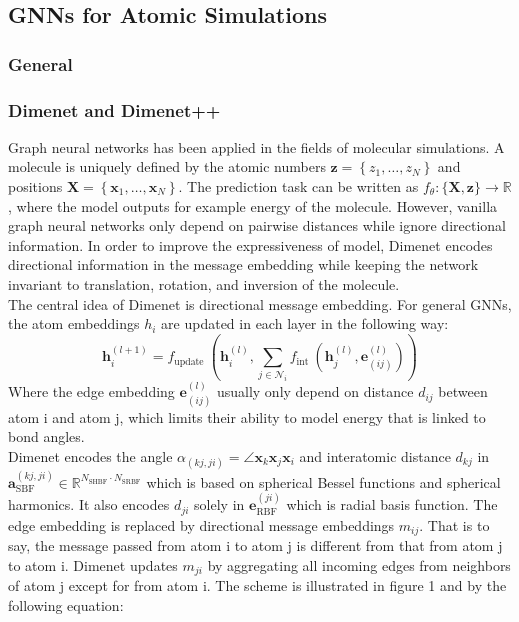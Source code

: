 \subsection{GNNs for Atomic Simulations}
\subsubsection{General}
\subsubsection{Dimenet and Dimenet++}
Graph neural networks has been applied in the fields of molecular simulations. A molecule is uniquely defined by the atomic numbers $\boldsymbol{z}=\left\{z_{1}, \ldots, z_{N}\right\}$ and positions $ \boldsymbol{X}=\left\{\boldsymbol{x}_{1}, \ldots, \boldsymbol{x}_{N}\right\}$. The prediction task can be written as $f_{\theta}:\{\boldsymbol{X}, \boldsymbol{z}\} \rightarrow \mathbb{R}$, where the model outputs for example energy of the molecule. However, vanilla graph neural networks only depend on pairwise distances while ignore directional information. In order to improve the expressiveness of model, Dimenet\cite*{DBLP:journals/corr/abs-2003-03123} encodes directional information in the message embedding while keeping the network invariant to translation, rotation, and inversion of the molecule\cite*{DBLP:journals/corr/abs-2003-03123}.\\
The central idea of Dimenet is directional message embedding. For general GNNs, the atom embeddings $h_i$ are updated in each layer in the following way:\\
\begin{equation}
    \boldsymbol{h}_{i}^{(l+1)}=f_{\text {update }}\left(\boldsymbol{h}_{i}^{(l)}, \sum_{j \in \mathcal{N}_{i}} f_{\text {int }}\left(\boldsymbol{h}_{j}^{(l)}, \boldsymbol{e}_{(i j)}^{(l)}\right)\right)
\end{equation}
Where the edge embedding $\boldsymbol{e}_{(i j)}^{(l)}$ usually only depend on distance $d_{ij}$ between atom i and atom j, which limits their ability to model energy that is linked to bond angles.\\
Dimenet encodes the angle $\alpha_{(k j, j i)}=\angle \boldsymbol{x}_{k} \boldsymbol{x}_{j} \boldsymbol{x}_{i}$ and interatomic distance $d_{kj}$ in $\boldsymbol{a}_{\mathrm{SBF}}^{(k j, j i)} \in \mathbb{R}^{N_{\mathrm{SHBF}} \cdot N_{\mathrm{SRBF}}}$ which is based
on spherical Bessel functions and spherical harmonics. It also encodes $d_{ji}$ solely in $\boldsymbol{e}_{\mathrm{RBF}}^{(j i)}$ which is radial basis function.  The edge embedding is replaced by directional message embeddings $m_{ij}$. That is to say, the message passed from atom i to atom j is different from that from atom j to atom i. Dimenet updates $m_{ji}$ by aggregating all incoming edges from neighbors of atom j except for from atom i. The scheme is illustrated in figure 1 and by the following equation:
